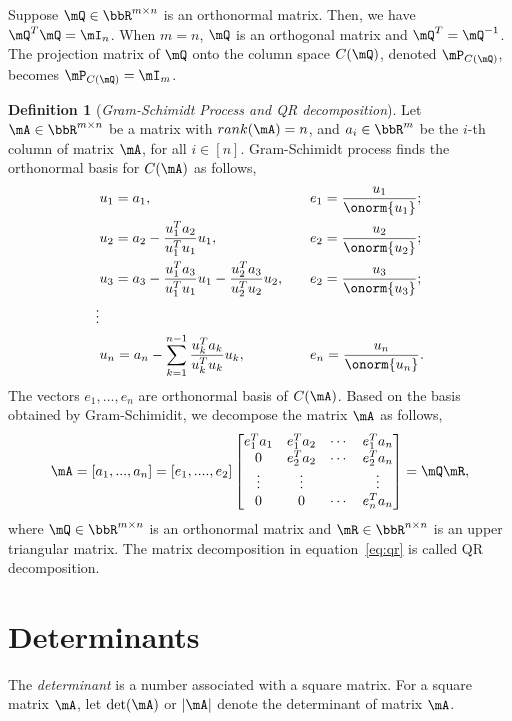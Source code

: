\documentclass[11pt]{article}
\theoremstyle{plain}
\theoremstyle{definition}
\newtheorem{defn}{Definition}
\begin{document}
Suppose $\mQ \in \bbR^{m \times n}$ is an orthonormal matrix. Then, we have $\mQ^T \mQ = \mI_n$.  When $m = n$, $\mQ$ is an orthogonal matrix and $\mQ^T = \mQ^{-1}$. The projection matrix of $\mQ$ onto the column space $C(\mQ)$, denoted $\mP_{C(\mQ)}$,  becomes $\mP_{C(\mQ)} = \mI_m$.

\begin{defn}[\textit{Gram-Schimidt Process and QR decomposition}]\label{gram-schimidt}
Let $\mA \in \bbR^{m \times n}$ be a matrix with $rank(\mA) = n$, and  $a_i \in \bbR^{m}$ be the $i$-th column of matrix $\mA$, for all $i \in [n]$. Gram-Schimidt process finds the orthonormal basis for $C(\mA)$ as follows,
\begin{align}
	&u_1 = a_1, &&\quad e_1 = \frac{u_1}{\onorm{u_1}};\\
	&u_2 = a_2 - \frac{u_1^T a_2}{u_1^T u_1} u_1 ,&&\quad  e_2 = \frac{u_2}{\onorm{u_2}};\\
	&u_3 = a_3 - \frac{u_1^T a_3}{u_1^T u_1} u_1 - \frac{u_2^T a_3}{u_2^T u_2} u_2,&&\quad  e_2 = \frac{u_3}{\onorm{u_3}};\\
	\vdots\\
	&u_n = a_n - \sum_{k = 1}^{n-1} \frac{u_k^T a_k}{u_k^T u_k} u_k, && \quad e_n = \frac{u_n}{\onorm{u_n}}.
\end{align}
 The vectors $e_1,...,e_n$ are orthonormal basis of $C(\mA)$. Based on the basis obtained by Gram-Schimidit, we decompose the matrix $\mA$ as follows,
 \begin{equation}\label{eq:qr}
 	\mA = [a_1,...,a_n] = [e_1,....,e_2] \begin{bmatrix}
 		e_1^T a_1 & e_1^T a_2 & \cdots & e_1^T a_n\\
 		0&e_2^T a_2 & \cdots & e_2^T a_n\\
 		\vdots &\vdots & & \vdots \\
 		0 &0&\cdots & e_n^T a_n
 	\end{bmatrix} = \mQ \mR,
 \end{equation}
	where $\mQ \in \bbR^{m \times n}$ is an orthonormal matrix and $\mR \in \bbR^{n \times n}$ is an upper triangular matrix. The matrix decomposition in equation~\eqref{eq:qr} is called QR decomposition.
\end{defn}

\section{Determinants}
The \textit{determinant} is a number associated with a square matrix. For a square matrix $\mA$, let $\det(\mA)$ or $|\mA|$ denote the determinant of matrix $\mA$.
\end{document}
